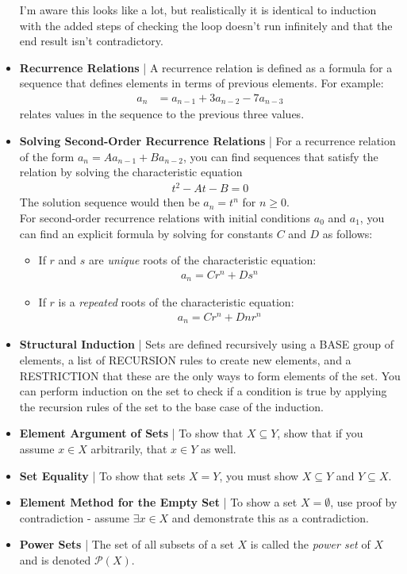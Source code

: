 \documentclass[11pt]{article}
\begin{document}
\begin{itemize}
\begin{itemize}
    \end{itemize}
    I'm aware this looks like a lot, but realistically it is identical to induction with the added steps of checking the loop doesn't run infinitely and that the end result isn't contradictory.
    \item \textbf{Recurrence Relations} | A recurrence relation is defined as a formula for a sequence that defines elements in terms of previous elements. For example:
    \begin{align*}
        a_n &= a_{n-1} + 3a_{n-2} - 7a_{n-3}
    \end{align*}
    relates values in the sequence to the previous three values.
    \item \textbf{Solving Second-Order Recurrence Relations} | For a recurrence relation of the form $a_n = Aa_{n-1} + Ba_{n-2}$, you can find sequences that satisfy the relation by solving the characteristic equation
    \begin{align*}
        t^2 - At -B = 0
    \end{align*}
    The solution sequence would then be $a_n = t^n$ for $n \geq 0$. \\
    For second-order recurrence relations with initial conditions $a_0$ and $a_1$, you can find an explicit formula by solving for constants $C$ and $D$ as follows:
    \begin{itemize}
        \item If $r$ and $s$ are \textit{unique} roots of the characteristic equation:
        \begin{align*}
            a_n = Cr^n + Ds^n
        \end{align*}
        \item If $r$ is a \textit{repeated} roots of the characteristic equation:
        \begin{align*}
            a_n = Cr^n + Dnr^n
        \end{align*}
    \end{itemize}
    \item \textbf{Structural Induction} | Sets are defined recursively using a BASE group of elements, a list of RECURSION rules to create new elements, and a RESTRICTION that these are the only ways to form elements of the set. You can perform induction on the set to check if a condition is true by applying the recursion rules of the set to the base case of the induction.
    \item \textbf{Element Argument of Sets} | To show that $X \subseteq Y$, show that if you assume $x \in X$ arbitrarily, that $x \in Y$ as well.
    \item \textbf{Set Equality} | To show that sets $X = Y$, you must show $X \subseteq Y$ and $Y \subseteq X$.
    \item \textbf{Element Method for the Empty Set} | To show a set $X = \emptyset$, use proof by contradiction - assume $\exists x \in X$ and demonstrate this as a contradiction.
    \item \textbf{Power Sets} | The set of all subsets of a set $X$ is called the \textit{power set} of $X$ and is denoted $\mathscr{P}(X)$.
\end{itemize}
\end{document}
